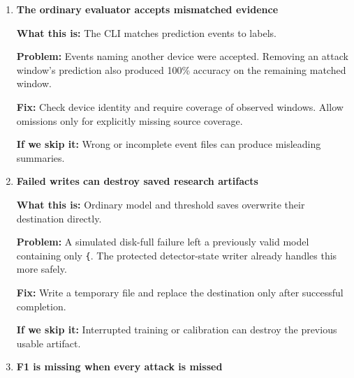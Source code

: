 \documentclass[11pt,a4paper]{article}
\begin{document}
\begin{enumerate}[series=findings]
\begin{minipage}[t]{\linewidth}
\textbf{Fix:} Check the saved quantile, calibration captures, and sample count
against the configuration, as state restoration already does.

\textbf{If we skip it:} An experiment can run with different calibration settings
from those its configuration declares.
\end{minipage}

\item \begin{minipage}[t]{\linewidth}
\textbf{The ordinary evaluator accepts mismatched evidence}


\textbf{What this is:} The CLI matches prediction events to labels.

\textbf{Problem:} Events naming another device were accepted. Removing an attack
window's prediction also produced 100\% accuracy on the remaining matched window.

\textbf{Fix:} Check device identity and require coverage of observed windows.
Allow omissions only for explicitly missing source coverage.

\textbf{If we skip it:} Wrong or incomplete event files can produce misleading
summaries.
\end{minipage}

\item \begin{minipage}[t]{\linewidth}
\textbf{Failed writes can destroy saved research artifacts}


\textbf{What this is:} Ordinary model and threshold saves overwrite their
destination directly.

\textbf{Problem:} A simulated disk-full failure left a previously valid model
containing only \texttt{\{}. The protected detector-state writer already handles
this more safely.

\textbf{Fix:} Write a temporary file and replace the destination only after
successful completion.

\textbf{If we skip it:} Interrupted training or calibration can destroy the
previous usable artifact.
\end{minipage}

\item \begin{minipage}[t]{\linewidth}
\textbf{F1 is missing when every attack is missed}



\end{minipage}
\end{enumerate}
\end{document}
